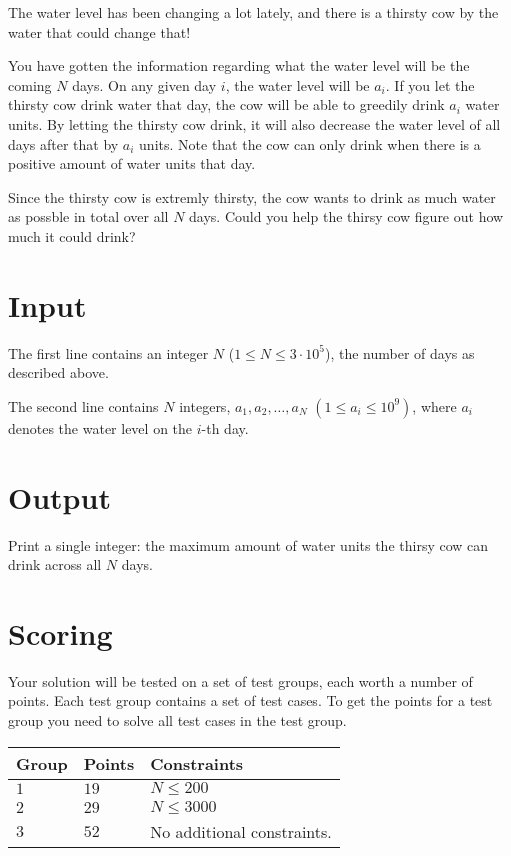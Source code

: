 
The water level has been changing a lot lately, and there is a thirsty cow by the water that could change that!

You have gotten the information regarding what the water level will be the coming $N$ days. 
On any given day $i$, the water level will be $a_i$. 
If you let the thirsty cow drink water that day, the cow will be able to greedily drink $a_i$ water units. 
By letting the thirsty cow drink, it will also decrease the water level of all days after that by $a_i$ units. 
Note that the cow can only drink when there is a positive amount of water units that day.

Since the thirsty cow is extremly thirsty, the cow wants to drink as much water as possble in total over all $N$ days. 
Could you help the thirsy cow figure out how much it could drink?

\section*{Input}
The first line contains an integer $N$ ($1 \leq N \leq 3 \cdot 10^5$), the number of days as described above.

The second line contains $N$ integers, $a_1, a_2, \dots, a_N$ $(1 \leq a_i \leq 10^9)$, where $a_i$ denotes the water level on the $i$-th day.

\section*{Output}
Print a single integer: the maximum amount of water units the thirsy cow can drink across all $N$ days. 

\section*{Scoring}
Your solution will be tested on a set of test groups, each worth a number of points. Each test group contains
a set of test cases. To get the points for a test group you need to solve all test cases in the test group.

\noindent
\begin{tabular}{| l | l | p{12cm} |}
  \hline
  \textbf{Group} & \textbf{Points} & \textbf{Constraints} \\ \hline
  $1$    & $19$       & $N \leq 200$ \\ \hline
  $2$    & $29$       & $N \leq 3000$ \\ \hline
  $3$    & $52$       & No additional constraints. \\ \hline
\end{tabular}

